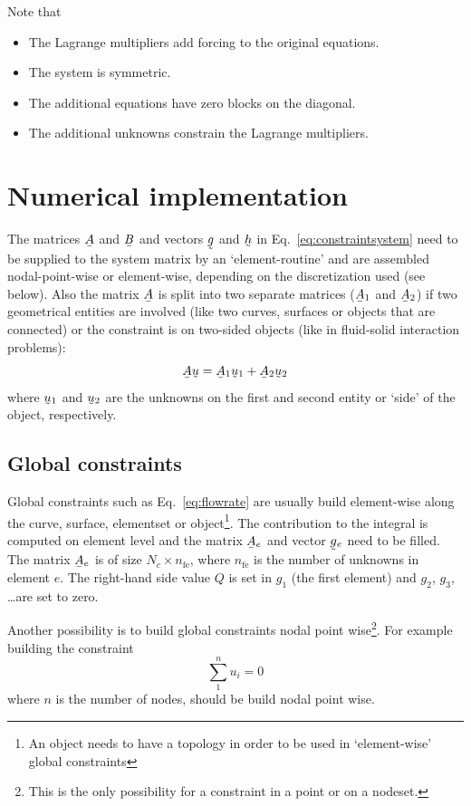 Note that
\begin{itemize}
   \item The Lagrange multipliers add forcing to the original equations.
   \item The system is symmetric.
   \item The additional equations have zero blocks on the diagonal.
   \item The additional unknowns constrain the Lagrange multipliers. 
\end{itemize}

\section{Numerical implementation}

The matrices $\mat A$ and $\mat B$ and vectors $\col g$ and $\col h$ 
in Eq.~\eqref{eq:constraintsystem} need to be supplied to the system matrix by
an `element-routine' and
are assembled nodal-point-wise or element-wise, depending on the discretization
used (see below). Also the matrix $\mat A$ is split into two separate matrices
($\mat A_1$ and $\mat A_2$) if two
geometrical entities are
involved (like two curves, surfaces or objects that are connected) or
the constraint is on two-sided
objects (like in fluid-solid interaction problems):
\[
\mat A\col u = \mat A_1\col u_1+\mat A_2\col u_2
\]
where $\col u_1$ and $\col u_2$ are the unknowns on the first and second
entity or `side' of the object, respectively.

\subsection*{Global constraints}

Global constraints such as Eq.~\eqref{eq:flowrate} are usually build
element-wise along the curve, surface, elementset or
object\footnote{An object needs to
have a topology in order to be used in `element-wise' global constraints}.
The contribution to the integral is computed on element level and the matrix
$\mat A_e$ and vector $\col g_e$ need to be filled. The matrix $\mat A_e$ is of
size $N_c\times n_\text{fe}$, where $n_\text{fe}$ is the number of unknowns
in element $e$. The
right-hand side value $Q$ is set in $g_1$ (the first element) and $g_2$, $g_3$,
\ldots are set to zero.

Another possibility is to build global constraints nodal point
wise\footnote{This is the only possibility for a constraint in a point
or on a nodeset.}. For
example building the constraint
\[
        \sum_1^n u_i=0
\]
where $n$ is the number of nodes, should be build nodal point wise.

